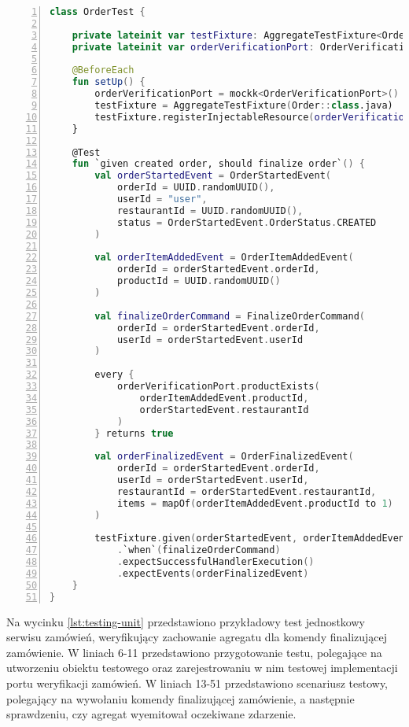 \begin{lstlisting}[caption={Przykładowy test jednostkowy serwisu zamówień},label={lst:testing-unit},captionpos=b,language=Kotlin,numbers=left]
class OrderTest {

    private lateinit var testFixture: AggregateTestFixture<Order>
    private lateinit var orderVerificationPort: OrderVerificationPort

    @BeforeEach
    fun setUp() {
        orderVerificationPort = mockk<OrderVerificationPort>()
        testFixture = AggregateTestFixture(Order::class.java)
        testFixture.registerInjectableResource(orderVerificationPort)
    }

    @Test
    fun `given created order, should finalize order`() {
        val orderStartedEvent = OrderStartedEvent(
            orderId = UUID.randomUUID(),
            userId = "user",
            restaurantId = UUID.randomUUID(),
            status = OrderStartedEvent.OrderStatus.CREATED
        )

        val orderItemAddedEvent = OrderItemAddedEvent(
            orderId = orderStartedEvent.orderId,
            productId = UUID.randomUUID()
        )

        val finalizeOrderCommand = FinalizeOrderCommand(
            orderId = orderStartedEvent.orderId,
            userId = orderStartedEvent.userId
        )

        every {
            orderVerificationPort.productExists(
                orderItemAddedEvent.productId,
                orderStartedEvent.restaurantId
            )
        } returns true

        val orderFinalizedEvent = OrderFinalizedEvent(
            orderId = orderStartedEvent.orderId,
            userId = orderStartedEvent.userId,
            restaurantId = orderStartedEvent.restaurantId,
            items = mapOf(orderItemAddedEvent.productId to 1)
        )

        testFixture.given(orderStartedEvent, orderItemAddedEvent)
            .`when`(finalizeOrderCommand)
            .expectSuccessfulHandlerExecution()
            .expectEvents(orderFinalizedEvent)
    }
}
\end{lstlisting}

Na wycinku \ref{lst:testing-unit} przedstawiono przykładowy test jednostkowy serwisu zamówień, weryfikujący zachowanie agregatu dla komendy finalizującej zamówienie. W liniach 6-11 przedstawiono przygotowanie testu, polegające na utworzeniu obiektu testowego oraz zarejestrowaniu w nim testowej implementacji portu weryfikacji zamówień. W liniach 13-51 przedstawiono scenariusz testowy, polegający na wywołaniu komendy finalizującej zamówienie, a następnie sprawdzeniu, czy agregat wyemitował oczekiwane zdarzenie.

